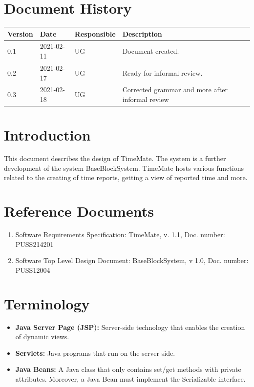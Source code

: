 \documentclass{article}
\date {#1}
\title {
    \documentNumber {01}    
    
    \documentVersion {0.3}
    
    \documentTitle {Software Top Level Design Document}
    \documentGroup {2}
    
    \documentResponsible {System Group}
    \documentAuthors {Developer Group}
    
    \documentDate {2021-02-18}
}
\begin{document}
\maketitle
\thispagestyle{empty}

\newpage

\tableofcontents

\newpage


\section{Document History}
\begin{tabular}{ l | l | l | l }
    Version & Date & Responsible & Description \\
    \hline
    0.1 & 2021-02-11 & UG & Document created. \\
    
    0.2 & 2021-02-17 & UG & Ready for informal review. \\
    
    0.3 & 2021-02-18 & UG & Corrected grammar and more after informal review \\
\end{tabular}

\section{Introduction}
This document describes the design of TimeMate. The system is a further development of the system BaseBlockSystem. TimeMate hosts various functions related to the creating of time reports, getting a view of reported time and more.

\section{Reference Documents}
\begin{enumerate}
    \item Software Requirements Specification: TimeMate, v. 1.1, Doc. number: PUSS214201
    \item Software Top Level Design Document: BaseBlockSystem, v 1.0, Doc. number: PUSS12004
\end{enumerate}

\section{Terminology}
\begin{itemize}
\item \textbf{Java Server Page (JSP):} Server-side technology that enables the creation of dynamic views.
\item \textbf{Servlets:} Java programs that run on the server side.
\item \textbf{Java Beans:} A Java class that only contains set/get methods with private attributes. Moreover, a Java Bean must implement the Serializable interface.
\end{itemize}
\end{document}
